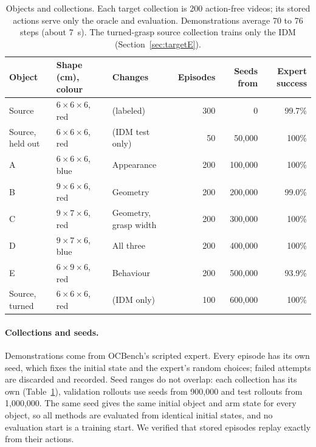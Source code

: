 \documentclass{article}
\begin{document}
\begin{table}[t]
  \caption{Objects and collections. Each target collection is 200 action-free videos; its
  stored actions serve only the oracle and evaluation. Demonstrations average 70 to 76
  steps (about 7~s). The turned-grasp source collection trains only the IDM
  (Section~\ref{sec:targetE}).}
  \label{tab:objects}
  \centering
  \small
  \begin{tabular}{@{}lllrrr@{}}
    \toprule
    Object & Shape (cm), colour & Changes & Episodes & Seeds from & Expert success \\
    \midrule
    Source & $6 \times 6 \times 6$, red & (labeled) & 300 & 0 & 99.7\% \\
    Source, held out & $6 \times 6 \times 6$, red & (IDM test only) & 50 & 50,000 & 100\% \\
    A & $6 \times 6 \times 6$, blue & Appearance & 200 & 100,000 & 100\% \\
    B & $9 \times 6 \times 6$, red & Geometry & 200 & 200,000 & 99.0\% \\
    C & $9 \times 7 \times 6$, red & Geometry, grasp width & 200 & 300,000 & 100\% \\
    D & $9 \times 7 \times 6$, blue & All three & 200 & 400,000 & 100\% \\
    E & $6 \times 9 \times 6$, red & Behaviour & 200 & 500,000 & 93.9\% \\
    Source, turned & $6 \times 6 \times 6$, red & (IDM only) & 100 & 600,000 & 100\% \\
    \bottomrule
  \end{tabular}
\end{table}

\paragraph{Collections and seeds.}
Demonstrations come from OCBench's scripted expert. Every episode has its own seed,
which fixes the initial state and the expert's random choices; failed attempts are
discarded and recorded. Seed ranges do not overlap: each collection has its own
(Table~\ref{tab:objects}), validation rollouts use seeds from 900,000 and test rollouts
from 1,000,000. The same seed gives the same initial object and arm state for every
object, so all methods are evaluated from identical initial states, and no evaluation
start is a training start. We verified that stored episodes replay exactly from their
actions.
\end{document}
